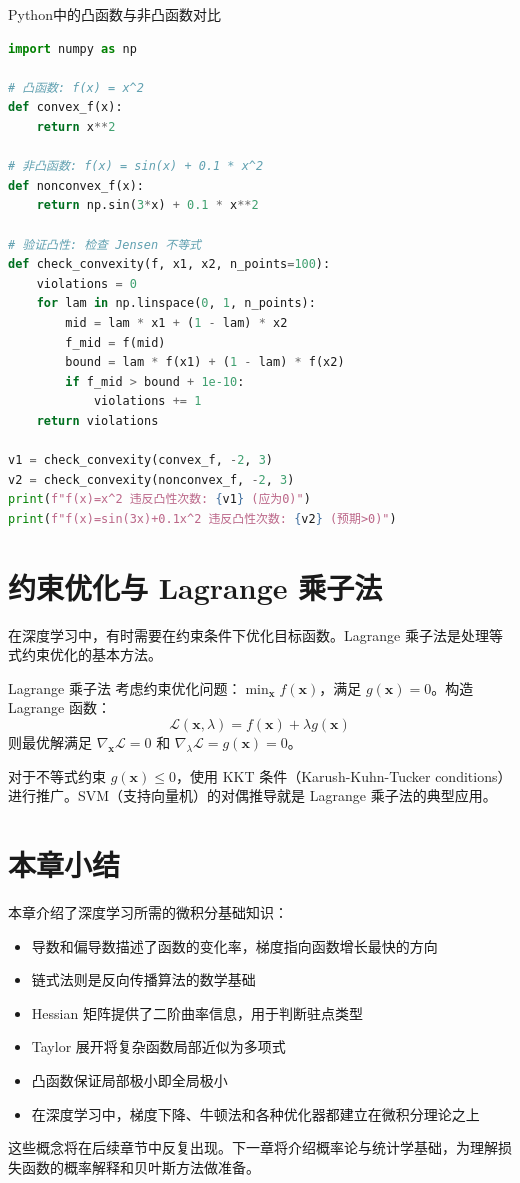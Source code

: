 \begin{mycode}{Python中的凸函数与非凸函数对比}
\begin{lstlisting}[language=Python]
import numpy as np

# 凸函数: f(x) = x^2
def convex_f(x):
    return x**2

# 非凸函数: f(x) = sin(x) + 0.1 * x^2
def nonconvex_f(x):
    return np.sin(3*x) + 0.1 * x**2

# 验证凸性: 检查 Jensen 不等式
def check_convexity(f, x1, x2, n_points=100):
    violations = 0
    for lam in np.linspace(0, 1, n_points):
        mid = lam * x1 + (1 - lam) * x2
        f_mid = f(mid)
        bound = lam * f(x1) + (1 - lam) * f(x2)
        if f_mid > bound + 1e-10:
            violations += 1
    return violations

v1 = check_convexity(convex_f, -2, 3)
v2 = check_convexity(nonconvex_f, -2, 3)
print(f"f(x)=x^2 违反凸性次数: {v1} (应为0)")
print(f"f(x)=sin(3x)+0.1x^2 违反凸性次数: {v2} (预期>0)")
\end{lstlisting}
\end{mycode}

\section{约束优化与 Lagrange 乘子法}

在深度学习中，有时需要在约束条件下优化目标函数。Lagrange 乘子法是处理等式约束优化的基本方法。

\begin{myTheorem}{Lagrange 乘子法}
考虑约束优化问题：$\min_{\mathbf{x}} f(\mathbf{x})$，满足 $g(\mathbf{x})=0$。构造 Lagrange 函数：
\[
\mathcal{L}(\mathbf{x},\lambda) = f(\mathbf{x}) + \lambda g(\mathbf{x})
\]
则最优解满足 $\nabla_{\mathbf{x}}\mathcal{L}=0$ 和 $\nabla_{\lambda}\mathcal{L}=g(\mathbf{x})=0$。
\end{myTheorem}

对于不等式约束 $g(\mathbf{x})\leq 0$，使用 KKT 条件（Karush-Kuhn-Tucker conditions）进行推广。SVM（支持向量机）的对偶推导就是 Lagrange 乘子法的典型应用。

\section{本章小结}

本章介绍了深度学习所需的微积分基础知识：
\begin{itemize}
    \item 导数和偏导数描述了函数的变化率，梯度指向函数增长最快的方向
    \item 链式法则是反向传播算法的数学基础
    \item Hessian 矩阵提供了二阶曲率信息，用于判断驻点类型
    \item Taylor 展开将复杂函数局部近似为多项式
    \item 凸函数保证局部极小即全局极小
    \item 在深度学习中，梯度下降、牛顿法和各种优化器都建立在微积分理论之上
\end{itemize}

这些概念将在后续章节中反复出现。下一章将介绍概率论与统计学基础，为理解损失函数的概率解释和贝叶斯方法做准备。
